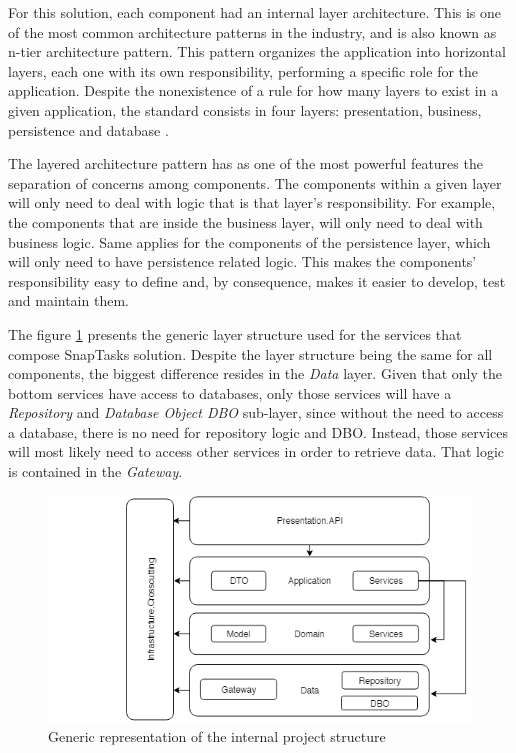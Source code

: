 \par

For this solution, each component had an internal layer architecture. This is one of the most common architecture patterns in the industry, and is also known as n-tier architecture pattern. This pattern organizes the application into horizontal layers, each one with its own responsibility, performing a specific role for the application. Despite the nonexistence of a rule for how many layers to exist in a given application, the standard consists in four layers: presentation, business, persistence and database \parencite{softwareArchitecturePatterns}.   

\par

The layered architecture pattern has as one of the most powerful features the separation of concerns among components. The components within a given layer will only need to deal with logic that is that layer's responsibility. For example, the components that are inside the business layer, will only need to deal with business logic. Same applies for the components of the persistence layer, which will only need to have persistence related logic. This makes the components' responsibility easy to define and, by consequence, makes it easier to develop, test and maintain them.

\par

The figure \ref{fig:internalProjectArchitecture} presents the generic layer structure used for the services that compose SnapTasks solution. Despite the layer structure being the same for all components, the biggest difference resides in the \textit{Data} layer. Given that only the bottom services have access to databases, only those services will have a \textit{Repository} and \textit{Database Object \gls{DBO}} sub-layer, since without the need to access a database, there is no need for repository logic and \gls{DBO}. Instead, those services will most likely need to access other services in order to retrieve data. That logic is contained in the \textit{Gateway}.

\par
\begin{figure}[ht]
\centering
\includegraphics[width=\textwidth,keepaspectratio]{chapters/Implementation/assets/Internal-Service-Architecture.png}
\caption[Generic representation of the internal project structure]{Generic representation of the internal project structure}
\label{fig:internalProjectArchitecture}
\end{figure}

